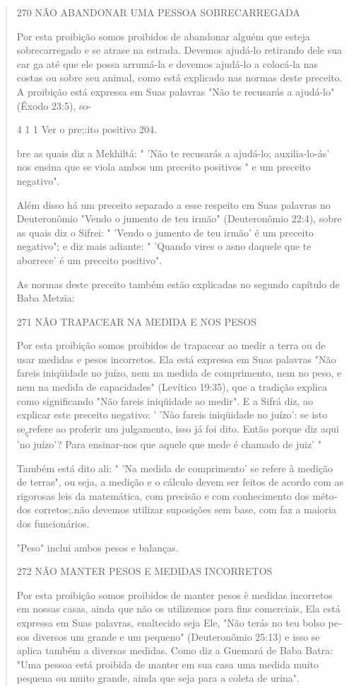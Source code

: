 \begin{quote}
270 NÃO ABANDONAR UMA PESSOA SOBRECARREGADA

Por esta proibição somos proibidos de abandonar alguém que esteja
sobrecarregado e se atrase na estrada. Devemos ajudá-lo retirando dele
sua car ga até que ele possa arrumá-la e devemos ajudá-lo a colocá-la
nas costas ou so­bre seu animal, como está explicado nas normas deste
preceito. A proibição está expressa em Suas palavras "Não te recusarás a
ajudá-lo" (Êxodo 23:5), so-

4 1 1 Ver o pre;:ito positivo 204.

bre as quais diz a Mekhiltá: " 'Não te recusarás a ajudá-lo;
auxilia-lo-ás' nos en­sina que se viola ambos um preceito positivos " e
um preceito negativo".

Além disso há um preceito separado a esse respeito em Suas pala­vras no
Deuteronômio "Vendo o jumento de teu irmão" (Deuteronômio 22:4), sobre
as quais diz o Sifrei: " 'Vendo o jumento de teu irmão' é um preceito
negativo"; e diz mais adiante: " 'Quando vires o asno daquele que te
aborrece' é um preceito positivo".

As normas deste preceito também estão explicadas no segundo ca­pítulo de
Baba Metzia:

271 NÃO TRAPACEAR NA MEDIDA E NOS PESOS

Por esta proibição somos proibidos de trapacear ao medir a terra ou de
usar medidas e pesos incorretos. Ela está expressa em Suas palavras "Não
fareis iniqüidade no juízo, nem na medida de comprimento, nem no peso, e
nem na medida de capacidades" (Levítico 19:35), que a tradição explica
como significando "Não fareis iniqüidade ao medir". E a Sifrá diz, ao
explicar este preceito negativo: ' 'Nào fareis iniqüidade no juízo': se
isto se\textsubscript{ç}refere ao profe­rir um julgamento, isso já foi
dito. Então porque diz aqui 'no juízo'? Para ensinar-nos que aquele que
mede é chamado de juiz' "

Também está dito ali: " 'Na medida de comprimento' se refere à me­dição
de terras", ou seja, a medição e o cálculo devem ser feitos de acordo
com as rigorosas leis da matemática, com precisão e com conhecimento dos
méto­dos corretos;.não devemos utilizar suposições sem base, com faz a
maioria dos funcionários.

"Peso" inclui ambos pesos e balanças.

272 NÃO MANTER PESOS E MEDIDAS INCORRETOS

Por esta proibição somos proibidos de manter pesos è medidas in­corretos
em nossas casas, ainda que não os utilizemos para fins comerciais, Ela
está expressa em Suas palavras, enaltecido seja Ele, "Não terás no teu
bolso pe­sos diversos um grande e um pequeno" (Deuteronômio 25:13) e
isso se aplica também a diversas medidas. Como diz a Guemará de Baba
Batra: "Uma pessoa está proibida de manter em sua casa uma medida muito
pequena ou muito gran­de, ainda que seja para a coleta de urina".


\end{quote}
